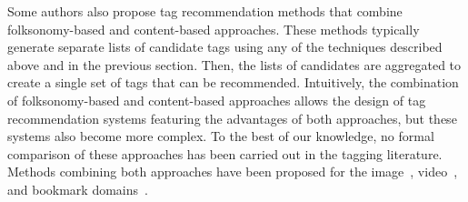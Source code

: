 Some authors also propose tag recommendation methods that combine folk\-so\-no\-my-based and content-based approaches.
These methods typically generate separate lists of candidate tags using any of the techniques described above and in the previous section.
Then, the lists of candidates are aggregated to create a single set of tags that can be recommended. 
Intuitively, the combination of folksonomy-based and content-based approaches allows the design of tag recommendation systems featuring the advantages of both approaches, but these systems also become more complex. To the best of our knowledge, no formal comparison of these approaches has been carried out in the tagging literature.
Methods combining both approaches have been proposed for the image~\citep{Anderson2008,Wu2009,Liu2010a,Lee2010,Sevil2010a}, video~\citep{Ballan2010}, and bookmark domains~\citep{Zhang2009,Lops2012}.


